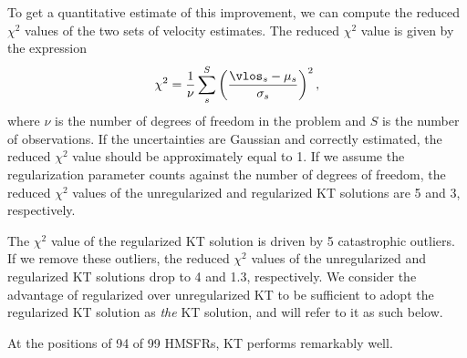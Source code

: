 To get a quantitative estimate of this improvement, we can compute the reduced $\chi^2$ values of the two sets of velocity estimates. 
The reduced $\chi^2$ value is given by the expression
\begin{equation}
\chi^2 = \frac{1}{\nu} \sum_s^{S} \left(\frac{\vlos_s - \mu_s}{\sigma_s} \right)^2, 
\end{equation}
where $\nu$ is the number of degrees of freedom in the problem and $S$ is the number of observations.
If the uncertainties are Gaussian and correctly estimated, the reduced $\chi^2$ value should be approximately equal to 1.
If we assume the regularization parameter counts against the number of degrees of freedom, the reduced $\chi^2$ values of the unregularized and regularized KT solutions are 5 and 3, respectively.

The $\chi^2$ value of the regularized KT solution is driven by 5 catastrophic outliers. 
If we remove these outliers, the reduced $\chi^2$ values of the unregularized and regularized KT solutions drop to 4 and 1.3, respectively. 
We consider the advantage of regularized over unregularized KT to be sufficient to adopt the regularized KT solution as \emph{the} KT solution, and will refer to it as such below.

At the positions of 94 of 99 HMSFRs, KT performs remarkably well. 
